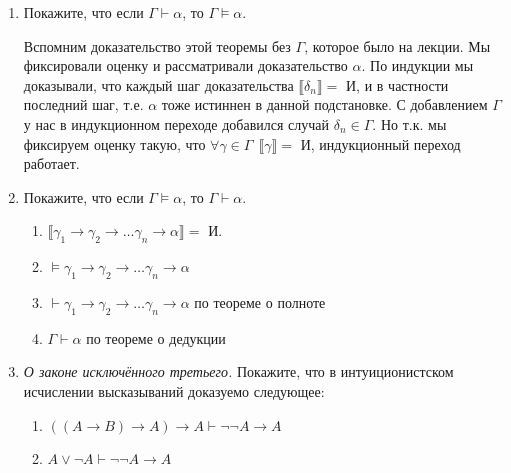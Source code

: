 

\cfoot{}




\begin{enumerate}
    \item Покажите, что если $\Gamma \vdash \alpha$, то $\Gamma \vDash \alpha$.

          Вспомним доказательство этой теоремы без \(\Gamma\), которое было на лекции. Мы фиксировали оценку и рассматривали доказательство \(\alpha\). По индукции мы доказывали, что каждый шаг доказательства \(\llbracket \delta_n \rrbracket =\) И, и в частности последний шаг, т.е. \(\alpha\) тоже истиннен в данной подстановке. С добавлением \(\Gamma\) у нас в индукционном переходе добавился случай \(\delta_n \in \Gamma\). Но т.к. мы фиксируем оценку такую, что \(\forall \gamma \in \Gamma \ \ \llbracket \gamma \rrbracket =\) И, индукционный переход работает.

    \item Покажите, что если $\Gamma \vDash \alpha$, то $\Gamma \vdash \alpha$.

          \begin{enumerate}
              \item \(\llbracket \gamma_1 \to \gamma_2 \to \dots \gamma_n \to \alpha \rrbracket =\) И.
              \item \(\vDash \gamma_1 \to \gamma_2 \to \dots \gamma_n \to \alpha\)
              \item \(\vdash \gamma_1 \to \gamma_2 \to \dots \gamma_n \to \alpha\) по теореме о полноте
              \item \(\Gamma \vdash \alpha\) по теореме о дедукции
          \end{enumerate}

    \item \emph{О законе исключённого третьего.} Покажите, что в интуиционистском исчислении высказываний
          доказуемо следующее:

          \begin{enumerate}
              \item $((A\rightarrow B)\rightarrow A)\rightarrow A \vdash \neg\neg A \rightarrow A$
              \item $A \vee \neg A \vdash \neg\neg A \rightarrow A$


\end{enumerate}
\end{enumerate}
